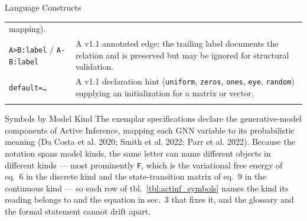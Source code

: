 \documentclass[
  ignorenonframetext,
]{beamer}
\begin{document}
\begin{frame}{Language Constructs}
\begin{longtable}[]{@{}
  >{\raggedright\arraybackslash}p{}
  >{\raggedright\arraybackslash}p{}@{}}
mapping). \\
\texttt{A\textgreater{}B:label} / \texttt{A-B:label} & A v1.1 annotated
edge; the trailing label documents the relation and is preserved but may
be ignored for structural validation. \\
\texttt{default=…} & A v1.1 declaration hint (\texttt{uniform},
\texttt{zeros}, \texttt{ones}, \texttt{eye}, \texttt{random}) supplying
an initialization for a matrix or vector. \\
\bottomrule\noalign{}
\end{longtable}
\end{frame}

\begin{frame}{Symbols by Model Kind}
\protect{}\label{symbols-by-model-kind}
The exemplar specifications declare the generative-model components of
Active Inference, mapping each GNN variable to its probabilistic meaning
(Da Costa et al. 2020; Smith et al. 2022; Parr et al. 2022). Because the
notation spans model kinds, the same letter can name different objects
in different kinds --- most prominently \texttt{F}, which is the
variational free energy of eq.~6 in the discrete kind and the
state-transition matrix of eq.~9 in the continuous
kind --- so each row of tbl.~\ref{tbl:actinf_symbols} names the kind its
reading belongs to and the equation in sec.~3
that fixes it, and the glossary and the formal statement cannot drift
apart.

\end{frame}
\end{document}

